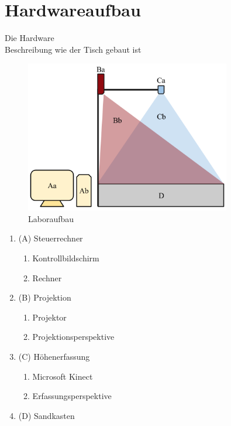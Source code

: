 \section{Hardwareaufbau}
\begin{Spacing}{\mylinespace}

Die Hardware \\

Beschreibung wie der Tisch gebaut ist\\

\begin{figure}[hbtp]
	\centering
	\label{fig:laboraufbauaufbau}
	\includegraphics[width=0.8\textwidth]{graphics/Aufbau.png}
	\caption{Laboraufbau}
\end{figure}

\begin{enumerate}  
      \item (A) Steuerrechner
      \begin{enumerate}
         \item Kontrollbildschirm
         \item Rechner
      \end{enumerate}
      \item (B) Projektion
      \begin{enumerate}
         \item Projektor
         \item Projektionsperspektive
      \end{enumerate}
      \item (C) Höhenerfassung
      \begin{enumerate}
         \item Microsoft Kinect
         \item Erfassungsperspektive
      \end{enumerate}
      \item (D) Sandkasten
 \end{enumerate}
   

\end{Spacing}
